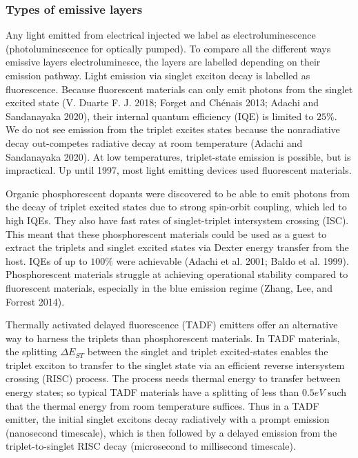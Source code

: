 \documentclass[
  letterpaper,
  DIV=11,
  numbers=noendperiod,
  oneside]{scrreprt}
\begin{document}
\hypertarget{sec-type}{%
\subsubsection{Types of emissive layers}\label{sec-type}}

Any light emitted from electrical injected we label as
electroluminescence (photoluminescence for optically pumped). To compare
all the different ways emissive layers electroluminesce, the layers are
labelled depending on their emission pathway. Light emission via singlet
exciton decay is labelled as fluorescence. Because fluorescent materials
can only emit photons from the singlet excited state (V. Duarte F. J.
2018; Forget and Chénais 2013; Adachi and Sandanayaka 2020), their
internal quantum efficiency (IQE) is limited to \(25\%\). We do not see
emission from the triplet excites states because the nonradiative decay
out-competes radiative decay at room temperature (Adachi and Sandanayaka
2020). At low temperatures, triplet-state emission is possible, but is
impractical. Up until 1997, most light emitting devices used fluorescent
materials.

Organic phosphorescent dopants were discovered to be able to emit
photons from the decay of triplet excited states due to strong
spin-orbit coupling, which led to high IQEs. They also have fast rates
of singlet-triplet intersystem crossing (ISC). This meant that these
phosphorescent materials could be used as a guest to extract the
triplets and singlet excited states via Dexter energy transfer from the
host. IQEs of up to \(100\%\) were achievable (Adachi et al. 2001; Baldo
et al. 1999). Phosphorescent materials struggle at achieving operational
stability compared to fluorescent materials, especially in the blue
emission regime (Zhang, Lee, and Forrest 2014).

Thermally activated delayed fluorescence (TADF) emitters offer an
alternative way to harness the triplets than phosphorescent materials.
In TADF materials, the splitting \(\Delta E_{ST}\) between the singlet
and triplet excited-states enables the triplet exciton to transfer to
the singlet state via an efficient reverse intersystem crossing (RISC)
process. The process needs thermal energy to transfer between energy
states; so typical TADF materials have a splitting of less than
\(0.5 eV\) such that the thermal energy from room temperature suffices.
Thus in a TADF emitter, the initial singlet excitons decay radiatively
with a prompt emission (nanosecond timescale), which is then followed by
a delayed emission from the triplet-to-singlet RISC decay (microsecond
to millisecond timescale).
\end{document}
